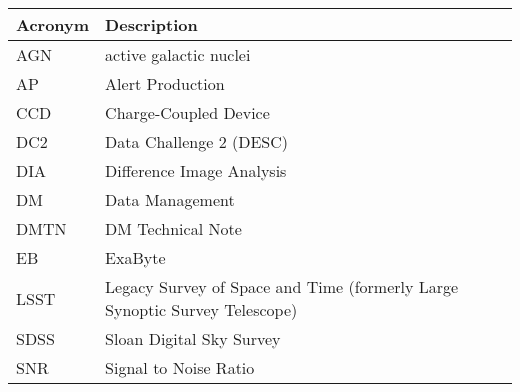 \addtocounter{table}{-1}
\begin{longtable}{p{}p{}}\hline
\textbf{Acronym} & \textbf{Description}  \\\hline

AGN & active galactic nuclei \\\hline
AP & Alert Production \\\hline
CCD & Charge-Coupled Device \\\hline
DC2 & Data Challenge 2 (DESC) \\\hline
DIA & Difference Image Analysis \\\hline
DM & Data Management \\\hline
DMTN & DM Technical Note \\\hline
EB & ExaByte \\\hline
LSST & Legacy Survey of Space and Time (formerly Large Synoptic Survey Telescope) \\\hline
SDSS & Sloan Digital Sky Survey \\\hline
SNR & Signal to Noise Ratio \\\hline
\end{longtable}
